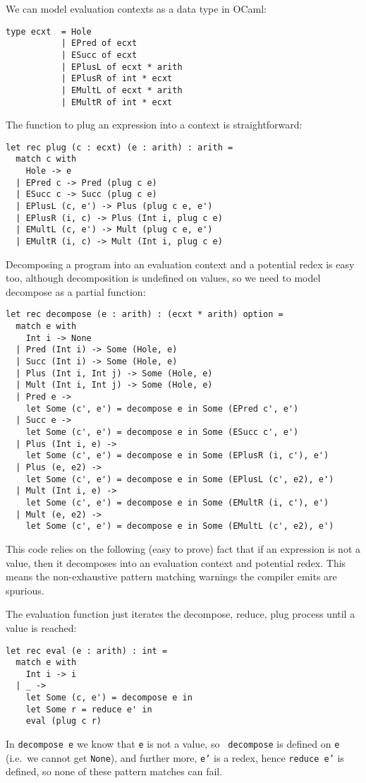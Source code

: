 \documentclass[11pt]{article}
\begin{document}
We can model evaluation contexts as a data type in OCaml:
\begin{verbatim}
type ecxt  = Hole
           | EPred of ecxt
           | ESucc of ecxt
           | EPlusL of ecxt * arith
           | EPlusR of int * ecxt
           | EMultL of ecxt * arith
           | EMultR of int * ecxt
\end{verbatim}
The function to plug an expression into a context is straightforward:
\begin{verbatim}
let rec plug (c : ecxt) (e : arith) : arith =
  match c with
    Hole -> e
  | EPred c -> Pred (plug c e)
  | ESucc c -> Succ (plug c e)
  | EPlusL (c, e') -> Plus (plug c e, e')
  | EPlusR (i, c) -> Plus (Int i, plug c e)
  | EMultL (c, e') -> Mult (plug c e, e')
  | EMultR (i, c) -> Mult (Int i, plug c e)
\end{verbatim}
Decomposing a program into an evaluation context and a potential redex
is easy too, although decomposition is undefined on values, so we
need to model decompose as a partial function:
\begin{verbatim}
let rec decompose (e : arith) : (ecxt * arith) option =
  match e with
    Int i -> None
  | Pred (Int i) -> Some (Hole, e)
  | Succ (Int i) -> Some (Hole, e)
  | Plus (Int i, Int j) -> Some (Hole, e)
  | Mult (Int i, Int j) -> Some (Hole, e)
  | Pred e -> 
    let Some (c', e') = decompose e in Some (EPred c', e')
  | Succ e -> 
    let Some (c', e') = decompose e in Some (ESucc c', e')
  | Plus (Int i, e) -> 
    let Some (c', e') = decompose e in Some (EPlusR (i, c'), e')
  | Plus (e, e2) ->
    let Some (c', e') = decompose e in Some (EPlusL (c', e2), e')
  | Mult (Int i, e) -> 
    let Some (c', e') = decompose e in Some (EMultR (i, c'), e')
  | Mult (e, e2) -> 
    let Some (c', e') = decompose e in Some (EMultL (c', e2), e')
\end{verbatim}
This code relies on the following (easy to prove) fact that if an
expression is not a value, then it decomposes into an evaluation
context and potential redex.  This means the non-exhaustive pattern
matching warnings the compiler emits are spurious.

The evaluation function just iterates the decompose, reduce, plug
process until a value is reached:
\begin{verbatim}
let rec eval (e : arith) : int =
  match e with
    Int i -> i
  | _ -> 
    let Some (c, e') = decompose e in
    let Some r = reduce e' in
    eval (plug c r)
\end{verbatim}
In {\tt decompose e} we know that {\tt e} is not a value, so {\tt
  decompose} is defined on {\tt e} (i.e.~we cannot get {\tt None}),
and further more, {\tt e'} is a redex, hence {\tt reduce e'} is
defined, so none of these pattern matches can fail.
\end{document}
